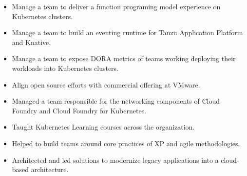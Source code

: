 \documentclass[10pt,a4paper,ragged2e,withhyper]{altacv}
\begin{document}


\begin{fullwidth}
\makecvheader
\end{fullwidth}


\begin{paracol}{2}

\begin{itemize}
\item Manage a team to deliver a function programing model experience on Kubernetes clusters.
\item Manage a team to build an eventing runtime for Tanzu Application Platform and Knative.
\item Manage a team to expose DORA metrics of teams working deploying their workloads into Kubernetes clusters.
\item Align open source efforts with commercial offering at VMware.
\end{itemize}

\divider

\begin{itemize}
\item Managed a team responsible for the networking components of Cloud Foundry and Cloud Foundry for Kubernetes.
\item Taught Kubernetes Learning courses across the organization.
\end{itemize}

\divider

\begin{itemize}
\item Helped to build teams around core practices of XP and agile methodologies.
\item Architected and led solutions to modernize legacy applications into a cloud-based architecture.
\end{itemize}


\end{paracol}
\end{document}
